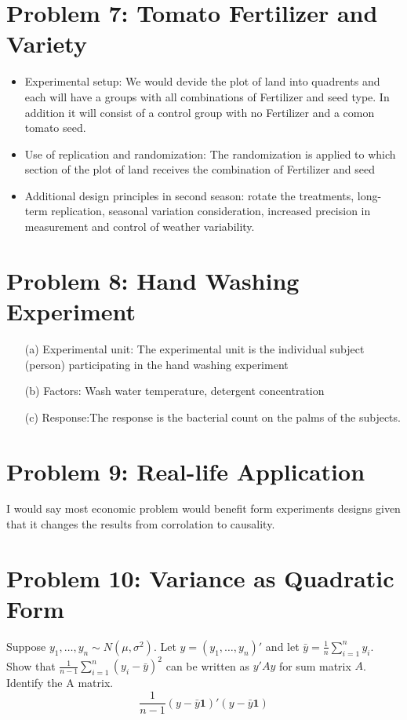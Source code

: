 \documentclass[10pt, oneside]{article}
\begin{document}
\section*{Problem 7: Tomato Fertilizer and Variety}
\begin{itemize}
	\item Experimental setup: We would devide the plot of land into quadrents and each will have a groups with all combinations of Fertilizer and seed type.
    In addition it will consist of a control group with no Fertilizer and a comon tomato seed.
	\item Use of replication and randomization: The randomization is applied to which section of the plot of land receives the combination of Fertilizer and seed
	\item Additional design principles in second season: rotate the treatments, long-term replication, seasonal variation consideration, increased precision in measurement and control of weather variability.  
\end{itemize}

\section*{Problem 8: Hand Washing Experiment}
\begin{itemize}
	\item[(a)] Experimental unit: The experimental unit is the individual subject (person) participating in the hand washing experiment
	\item[(b)] Factors: Wash water temperature, detergent concentration
	\item[(c)] Response:The response is the bacterial count on the palms of the subjects.
\end{itemize}

\section*{Problem 9: Real-life Application}
I would say most economic problem would benefit form experiments designs given that it changes the results from corrolation to causality.

\section*{Problem 10: Variance as Quadratic Form}
Suppose $y_1,\ldots,y_n \sim N(\mu,\sigma^2)$. Let $y = (y_1,\ldots,y_n)'$ and let $\bar{y} = \frac{1}{n}\sum^n_{i=1}y_i$. Show that 
$\frac{1}{n-1}\sum^n_{i=1}(y_i - \bar{y})^2$ can be written as $y'Ay$ for sum matrix $A$. Identify the A matrix.
\[
\frac{1}{n-1}(y - \bar{y}\mathbf{1})'(y - \bar{y}\mathbf{1})
\]
\end{document}
